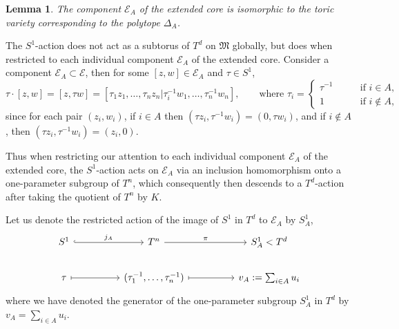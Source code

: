 \documentclass{article}
\newtheorem{lemma}[theorem]{Lemma}
\newcommand{\mcE}{\mathcal{E}}
\newcommand{\mc}[1]{\mathcal{#1}}
\newcommand{\mf}[1]{\mathfrak{#1}}
\begin{document}
	\begin{lemma}
		The component $\mc{E}_{A}$ of the extended core is isomorphic to the toric variety corresponding to the polytope $\Delta_{A}$.
	\end{lemma}
	
	The $S^{1}$-action does not act as a subtorus of $T^{d}$ on $\mf{M}$ globally, but does when restricted to each individual component $\mc{E}_{A}$ of the extended core. Consider a component $\mc{E}_{A} \subset \mc{E}$, then for some $[z,w] \in \mc{E}_{A}$ and $\tau \in S^{1}$,
	\[
		\tau \cdot [z,w] = [z,\tau w] = [\tau_{1} z_{1}, \ldots, \tau_{n} z_{n} | \tau_{i}^{-1}w_{1}, \ldots , \tau_{n}^{-1}w_{n}     ],\qquad \text{where } \tau_{i} = 
		\begin{cases}
			\tau^{-1} \qquad &\text{if } i \in A,\\
			1\qquad &\text{if } i \not\in A,
		\end{cases}	
	\]
	since for each pair $(z_{i}, w_{i})$, if $i \in A$ then $(\tau z_{i}, \tau^{-1}w_{i}) = (0, \tau w_{i})$, and if $i \not\in A$, then $(\tau z_{i}, \tau^{-1}w_{i}) = (z_{i}, 0)$.
	
	Thus when restricting our attention to each individual component $\mc{E}_{A}$ of the extended core, the $S^{1}$-action acts on $\mcE_{A}$ via an inclusion homomorphism onto a one-parameter subgroup of $T^{n}$, which consequently then descends to a $T^{d}$-action after taking the quotient of $T^{n}$ by $K$.
	
	Let us denote the restricted action of the image of $S^{1}$ in $T^{d}$ to $\mcE_{A}$ by $S^{1}_{A}$,
	\[
		\begin{tikzcd}
			S^{1} \arrow[rr, "j_{A}", hook] &  & T^{n} \arrow[rr, "\pi"]                                      &  & S^{1}_{A} < T^{d}    \\
			\tau \arrow[rr, maps to]        &  & {(\tau_{1}^{-1}, \ldots, \tau_{n}^{-1})} \arrow[rr, maps to] &  & v_{A} := \sum_{i \in A} u_{i}
		\end{tikzcd}
	\]
	where we have denoted the generator of the one-parameter subgroup $S_{A}^{1}$ in $T^{d}$ by $v_{A} = \sum_{i \in A} u_{i}$.
	
\end{document}
